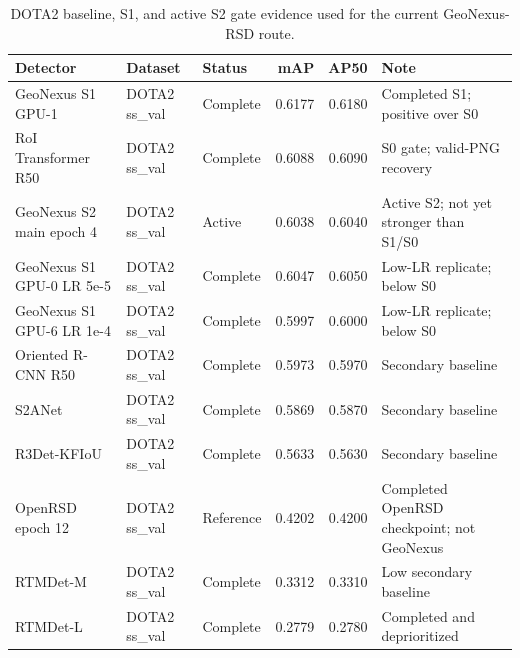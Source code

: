 \begin{table}[t]
\centering
\small
\caption{DOTA2 baseline, S1, and active S2 gate evidence used for the current GeoNexus-RSD route.}
\label{tab:dota2_baselines}
\begin{tabular}{lllrrl}
\toprule
Detector & Dataset & Status & mAP & AP50 & Note \\
\midrule
GeoNexus S1 GPU-1 & DOTA2 ss\_val & Complete & 0.6177 & 0.6180 & Completed S1; positive over S0 \\
RoI Transformer R50 & DOTA2 ss\_val & Complete & 0.6088 & 0.6090 & S0 gate; valid-PNG recovery \\
GeoNexus S2 main epoch 4 & DOTA2 ss\_val & Active & 0.6038 & 0.6040 & Active S2; not yet stronger than S1/S0 \\
GeoNexus S1 GPU-0 LR 5e-5 & DOTA2 ss\_val & Complete & 0.6047 & 0.6050 & Low-LR replicate; below S0 \\
GeoNexus S1 GPU-6 LR 1e-4 & DOTA2 ss\_val & Complete & 0.5997 & 0.6000 & Low-LR replicate; below S0 \\
Oriented R-CNN R50 & DOTA2 ss\_val & Complete & 0.5973 & 0.5970 & Secondary baseline \\
S2ANet & DOTA2 ss\_val & Complete & 0.5869 & 0.5870 & Secondary baseline \\
R3Det-KFIoU & DOTA2 ss\_val & Complete & 0.5633 & 0.5630 & Secondary baseline \\
OpenRSD epoch 12 & DOTA2 ss\_val & Reference & 0.4202 & 0.4200 & Completed OpenRSD checkpoint; not GeoNexus \\
RTMDet-M & DOTA2 ss\_val & Complete & 0.3312 & 0.3310 & Low secondary baseline \\
RTMDet-L & DOTA2 ss\_val & Complete & 0.2779 & 0.2780 & Completed and deprioritized \\
\bottomrule
\end{tabular}
\end{table}
